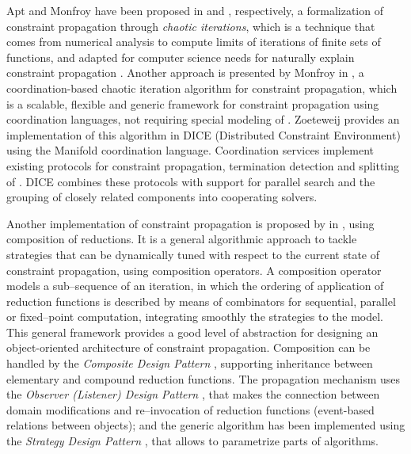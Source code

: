 Apt and Monfroy have been proposed in \cite{Apt} and \cite{Monfroy}, respectively, a formalization of constraint propagation through \textit{chaotic iterations}, which is a technique that comes from numerical analysis to compute limits of iterations of finite sets of functions, and adapted for computer science needs for naturally explain constraint propagation \cite{Chazan1969, Cousot1977}. Another approach is presented by Monfroy in \cite{Monfroy2000}, a coordination-based chaotic iteration algorithm for constraint propagation, which is a scalable, flexible and generic framework for constraint propagation using coordination languages, not requiring special modeling of \csps. Zoeteweij provides an implementation of this algorithm in {\sc DICE} (Distributed Constraint Environment) \cite{Zoeteweij2003} using the {\sc Manifold} coordination language. Coordination services implement existing protocols for constraint propagation, termination detection and splitting of \csps. {\sc DICE} combines these protocols with support for parallel search and the grouping of closely related components into cooperating solvers.

Another implementation of constraint propagation is proposed by  in \cite{Granvilliers2001}, using composition of reductions. It is a general algorithmic approach to tackle strategies that can be dynamically tuned with respect to the current state of constraint propagation, using composition operators. A composition operator models a sub--sequence of an iteration, in which the ordering of application of reduction functions is described by means of combinators for sequential, parallel or fixed--point computation, integrating smoothly the strategies to the model. This general framework provides a good level of abstraction for designing an object-oriented architecture of constraint propagation. Composition can be handled by the {\it Composite Design Pattern} \cite{DP_Composite}, supporting inheritance between elementary and compound reduction functions. The propagation mechanism uses the {\it Observer (Listener) Design Pattern} \cite{DP_Observer}, that makes the connection between domain modifications and re--invocation of reduction functions (event-based relations between objects); and the generic algorithm has been implemented using the {\it Strategy Design Pattern} \cite{DP_Strategy}, that allows to parametrize parts of algorithms.

